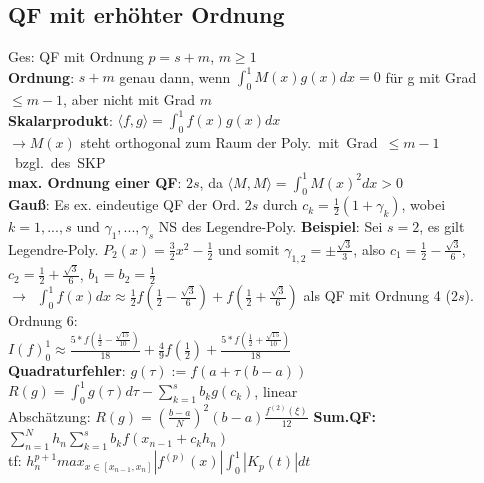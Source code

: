 \subsection{QF mit erhöhter Ordnung}
Ges: QF mit Ordnung $p = s + m$, $m \geq 1$\\
\textbf{Ordnung}: $s+m$ genau dann, wenn $\int_0^1M(x)g(x)dx = 0$ für g mit Grad $\leq m-1$, aber nicht mit Grad $m$\\
\textbf{Skalarprodukt}: $\langle f , g \rangle = \int_0^1f(x)g(x)dx$\\
$\rightarrow M(x)$ steht orthogonal zum Raum der \mbox{Poly. mit Grad $\leq m -1$ bzgl. des SKP}\\
\textbf{max. Ordnung einer QF}: $2s$, da  $\langle M , M \rangle = \int_0^1 M(x)^2dx > 0$\\
\textbf{Gauß}: Es ex. eindeutige QF der Ord. $2s$ durch $c_k = \frac{1}{2}(1 + \gamma_k)$, wobei $k = 1,...,s$ und $\gamma_1, ..., \gamma_s$ NS des Legendre-Poly.
\textbf{Beispiel}: Sei $s = 2$, es gilt Legendre-Poly. $P_2(x) = \frac{3}{2}x^2 - \frac{1}{2}$ und somit $\gamma_{1,2} = \pm \frac{\sqrt{3}}{3}$, also $c_1 = \frac{1}{2}-\frac{\sqrt{3}}{6}$, $c_2 = \frac{1}{2}+\frac{\sqrt{3}}{6}$, $b_1 = b_2 = \frac{1}{2}$\\
\mbox{$\rightarrow$ $\int_0^1f(x)dx \approx \frac{1}{2}f(\frac{1}{2}-\frac{\sqrt{3}}{6}) + f(\frac{1}{2}+\frac{\sqrt{3}}{6})$} als QF mit Ordnung 4 ($2s$). Ordnung 6:\\
$I(f)_0^1\approx \frac{5 * f(\frac{1}{2} - \frac{\sqrt{15}}{10})}{18} + \frac{4}{9}f(\frac{1}{2}) + \frac{5 * f(\frac{1}{2} + \frac{\sqrt{15}}{10})}{18}$\\
\textbf{Quadraturfehler}:  $g(\tau) := f(a + \tau(b-a))$\\
$R(g) = \int_0^1 g(\tau)d\tau - \sum_{k=1}^s b_kg(c_k)$, linear\\
Abschätzung: $R(g) = (\frac{b-a}{N})^2 (b-a) \frac{f^{(2)}(\xi)}{12}$
\textbf{Sum.QF:} $\sum_{n=1}^Nh_n\sum_{k=1}^sb_kf(x_{n-1}+c_kh_n)$\\
tf: $h_n^{p+1}max_{x\in[x_{n-1},x_n]}|f^{(p)}(x)|\int_0^1|K_p(t)|dt$
